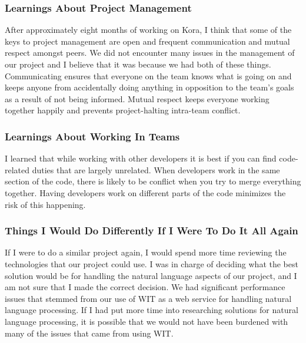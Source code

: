 \documentclass[onecolumn, draftclsnofoot,10pt, compsoc]{IEEEtran}
\begin{document}
	\subsubsection{Learnings About Project Management}
		After approximately eight months of working on Kora, I think that some of the keys to project management are open and frequent communication and mutual respect amongst peers.
		We did not encounter many issues in the management of our project and I believe that it was because we had both of these things.
		Communicating ensures that everyone on the team knows what is going on and keeps anyone from accidentally doing anything in opposition to the team's goals as a result of not being informed.
		Mutual respect keeps everyone working together happily and prevents project-halting intra-team conflict.

	\subsubsection{Learnings About Working In Teams}
		I learned that while working with other developers it is best if you can find code-related duties that are largely unrelated.
		When developers work in the same section of the code, there is likely to be conflict when you try to merge everything together.
		Having developers work on different parts of the code minimizes the risk of this happening.

	\subsubsection{Things I Would Do Differently If I Were To Do It All Again}
		If I were to do a similar project again, I would spend more time reviewing the technologies that our project could use.
		I was in charge of deciding what the best solution would be for handling the natural language aspects of our project, and I am not sure that I made the correct decision.
		We had significant performance issues that stemmed from our use of WIT as a web service for handling natural language processing.
		If I had put more time into researching solutions for natural language processing, it is possible that we would not have been burdened with many of the issues that came from using WIT.





\clearpage


	
	
\end{document}

